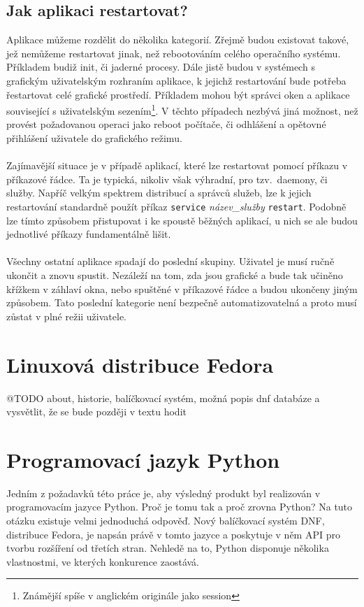\documentclass[
  field=inf,
  biblatex,
  glossaries,
  index
]{kidiplom}
\begin{document}
	\subsection{Jak aplikaci restartovat?}
	Aplikace můžeme rozdělit do několika kategorií. Zřejmě budou existovat takové, jež nemůžeme restartovat jinak, než rebootováním celého operačního systému. Příkladem budiž init, či jaderné procesy. Dále jistě budou v systémech s grafickým uživatelským rozhraním aplikace, k jejichž restartování bude potřeba řestartovat celé grafické prostředí. Příkladem mohou být správci oken a aplikace související s uživatelským sezením\footnote{Známější spíše v anglickém originále jako session}. V těchto případech nezbývá jiná možnost, než provést požadovanou operaci jako reboot počítače, či odhlášení a opětovné přihlášení uživatele do grafického režimu.
	\\
	\\
	Zajímavější situace je v případě aplikací, které lze restartovat pomocí příkazu v příkazové řádce. Ta je typická, nikoliv však výhradní, pro tzv.\ daemony, či služby. Napříč velkým spektrem distribucí a správců služeb, lze k jejich restartování standardně použít příkaz \texttt{service} \textit{název\_služby} \texttt{restart}. Podobně lze tímto způsobem přistupovat i ke spoustě běžných aplikací, u nich se ale budou jednotlivé příkazy fundamentálně lišit.
	\\
	\\
	Všechny ostatní aplikace spadají do poslední skupiny. Uživatel je musí ručně ukončit a znovu spustit. Nezáleží na tom, zda jsou grafické a bude tak učiněno křížkem v záhlaví okna, nebo spuštěné v příkazové řádce a budou ukončeny jiným způsobem. Tato poslední kategorie není bezpečně automatizovatelná a proto musí zůstat v plné režii uživatele.

\newpage
\section{Linuxová distribuce Fedora}
@TODO about, historie, balíčkovací systém, možná popis dnf databáze a vysvětlit, že se bude později v textu hodit

\newpage
\section{Programovací jazyk Python}
Jedním z požadavků této práce je, aby výsledný produkt byl realizován v programovacím jazyce Python. Proč je tomu tak a proč zrovna Python? Na tuto otázku existuje velmi jednoduchá odpověď. Nový balíčkovací systém DNF, distribuce Fedora, je napsán právě v tomto jazyce a poskytuje v něm API pro tvorbu rozšíření od třetích stran. Nehledě na to, Python disponuje několika vlastnostmi, ve kterých konkurence zaostává.
\end{document}
